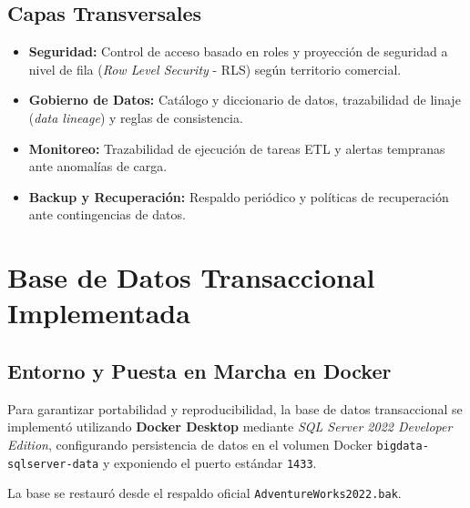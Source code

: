 \documentclass[11pt,letterpaper]{article}
\begin{document}
\subsection{Capas Transversales}
\begin{itemize}[leftmargin=*]
    \item \textbf{Seguridad:} Control de acceso basado en roles y proyección de seguridad a nivel de fila (\textit{Row Level Security} - RLS) según territorio comercial.
    \item \textbf{Gobierno de Datos:} Catálogo y diccionario de datos, trazabilidad de linaje (\textit{data lineage}) y reglas de consistencia.
    \item \textbf{Monitoreo:} Trazabilidad de ejecución de tareas ETL y alertas tempranas ante anomalías de carga.
    \item \textbf{Backup y Recuperación:} Respaldo periódico y políticas de recuperación ante contingencias de datos.
\end{itemize}

\section{Base de Datos Transaccional Implementada}

\subsection{Entorno y Puesta en Marcha en Docker}
Para garantizar portabilidad y reproducibilidad, la base de datos transaccional se implementó utilizando \textbf{Docker Desktop} mediante \textit{SQL Server 2022 Developer Edition}, configurando persistencia de datos en el volumen Docker \texttt{bigdata-sqlserver-data} y exponiendo el puerto estándar \texttt{1433}.

La base se restauró desde el respaldo oficial \texttt{AdventureWorks2022.bak}.
\end{document}
